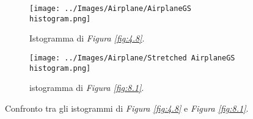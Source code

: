 \documentclass{subfiles}
\begin{document}
\begin{figure}[!h]
    \centering
    \begin{subfigure}[b]{0.4\textwidth}
        \centering
        \texttt{[image: ../Images/Airplane/AirplaneGS histogram.png]}
        \caption{Istogramma di \emph{Figura \ref{fig:4.8}}.}
    \end{subfigure}
    \hspace{10pt}
    \begin{subfigure}[b]{0.4\textwidth}
        \centering
        \texttt{[image: ../Images/Airplane/Stretched AirplaneGS histogram.png]}
        \caption{istogramma di \emph{Figura \ref{fig:8.1}}.}
    \end{subfigure}
    \caption{Confronto tra gli istogrammi di \emph{Figura \ref{fig:4.8}} e \emph{Figura \ref{fig:8.1}}.}
    \label{fig:8.2}
\end{figure}
\end{document}
